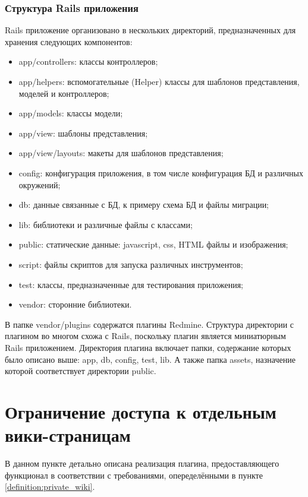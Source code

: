 \subsubsection{Структура Rails приложения}
Rails приложение организовано в нескольких директорий, предназначенных для
хранения следующих компонентов:
\begin{itemize}
\item app/controllers: классы контроллеров;
\item app/helpers: вспомогательные (Helper) классы для шаблонов представления,
моделей и контроллеров;
\item app/models: классы модели;
\item app/view: шаблоны представления;
\item app/view/layouts: макеты для шаблонов представления;
\item config: конфигурация приложения, в том числе конфигурация БД и различных
окружений;
\item db: данные связанные с БД, к примеру схема БД и файлы миграции;
\item lib: библиотеки и различные файлы с классами;
\item public: статические данные: javascript, css, HTML файлы и изображения;
\item script: файлы скриптов для запуска различных инструментов;
\item test: классы, предназначенные для тестирования приложения;
\item vendor: сторонние библиотеки.
\end{itemize}
В папке vendor/plugins содержатся плагины Redmine. Структура директории с
плагином во многом схожа с Rails, поскольку плагин является миниатюрным Rails
приложением. Директория плагина включает папки, содержание которых
было описано выше: app, db, config, test, lib. А также папка assets, назначение
которой соответствует директории public.


\section{Ограничение доступа к отдельным вики-страницам}
\label{section:private_wiki}
В данном пункте детально описана реализация плагина,
предоставляющего функционал в соответствии с требованиями, опеределёнными
в пункте \ref{definition:private_wiki}.

